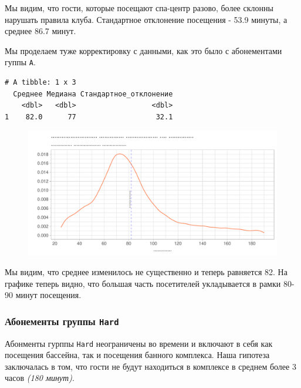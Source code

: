 \documentclass[
  letterpaper,
  DIV=11,
  numbers=noendperiod]{scrartcl}
\begin{document}
Мы видим, что гости, которые посещают спа-центр разово, более склонны
нарушать правила клуба. Стандартное отклонение посещения - 53.9 минуты,
а среднее 86.7 минут.

Мы проделаем туже корректировку с данными, как это было с абонементами
гуппы \texttt{А}.

\begin{verbatim}
# A tibble: 1 x 3
  Среднее Медиана Стандартное_отклонение
    <dbl>   <dbl>                  <dbl>
1    82.0      77                   32.1
\end{verbatim}

\begin{figure}

{\centering \includegraphics{./intro_files/figure-pdf/unnamed-chunk-28-1.pdf}

}

\end{figure}

Мы видим, что среднее изменилось не существенно и теперь равняется 82.
На графике теперь видно, что большая часть посетителей укладывается в
рамки 80-90 минут посещения.

\hypertarget{ux430ux431ux43eux43dux435ux43cux435ux43dux442ux44b-ux433ux440ux443ux43fux43fux44b-hard}{%
\subsubsection*{\texorpdfstring{Абонементы группы
\texttt{Hard}}{Абонементы группы Hard}}\label{ux430ux431ux43eux43dux435ux43cux435ux43dux442ux44b-ux433ux440ux443ux43fux43fux44b-hard}}

Абонменты гурппы \texttt{Hard} неограничены во времени и включают в себя
как посещения бассейна, так и посещения банного комплекса. Наша гипотеза
заключалась в том, что гости не будут находиться в комплексе в среднем
более 3 часов \emph{(180 минут)}.
\end{document}
